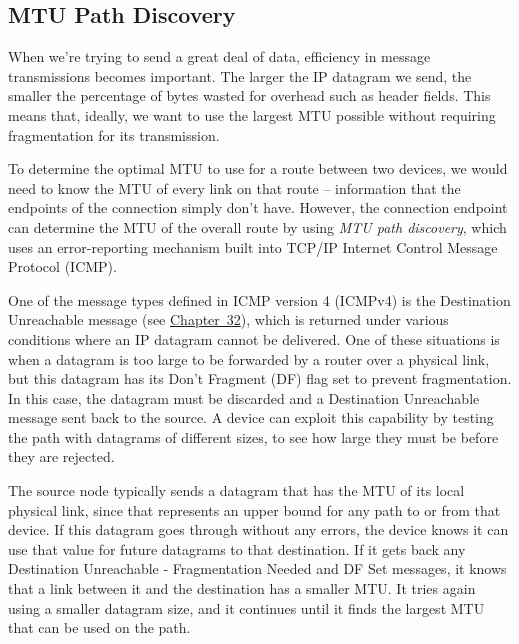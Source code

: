 \documentclass[b5paper,11pt]{memoir}
\begin{document}
\subsection[MTU Path
Discovery]{\texorpdfstring{\protect\hypertarget{ch22.htmlux5cux23mtu_path_discovery}{}{}MTU
Path Discovery}{MTU Path Discovery}}

\protect\hypertarget{ch22.htmlux5cux23idx-CHP-22-0804}{}{}When we're
trying to send a great deal of data, efficiency in message transmissions
becomes important. The larger the IP datagram we send, the smaller the
percentage of bytes wasted for overhead such as header fields. This
means that, ideally, we want to use the largest MTU possible without
requiring fragmentation for its transmission.

To determine the optimal MTU to use for a route between two devices, we
would need to know the MTU of every link on that route -- information
that the endpoints of the connection simply don't have. However, the
connection endpoint can determine the MTU of the overall route by using
{\emph{MTU path discovery}}, which uses an error-reporting mechanism
built into TCP/IP
\protect\hypertarget{ch22.htmlux5cux23idx-CHP-22-0805}{}{}Internet
Control Message Protocol (ICMP).

One of the message types defined in ICMP version 4 (ICMPv4) is the
\protect\hypertarget{ch22.htmlux5cux23idx-CHP-22-0806}{}{}Destination
Unreachable message (see \protect\hyperlink{ch32.html}{Chapter~32}),
which is returned under various conditions where an IP datagram cannot
be delivered. One of these situations is when a datagram is too large to
be forwarded by a router over a physical link, but this datagram has its
Don't Fragment (DF) flag set to prevent fragmentation. In this case, the
datagram must be discarded and a Destination Unreachable message sent
back to the source. A device can exploit this capability by testing the
path with datagrams of different sizes, to see how large they must be
before they are rejected.

The source node typically sends a datagram that has the MTU of its local
physical link, since that represents an upper bound for any path to or
from that device. If this datagram goes through without any errors, the
device knows it can use that value for future datagrams to that
destination. If it gets back any Destination Unreachable - Fragmentation
Needed and DF Set messages, it knows that a link between it and the
destination has a smaller MTU. It tries again using a smaller datagram
size, and it continues until it finds the largest MTU that can be used
on the path.
\end{document}
